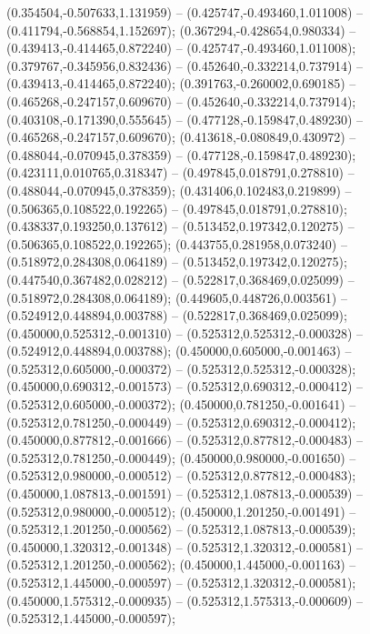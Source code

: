  (0.354504,-0.507633,1.131959) -- (0.425747,-0.493460,1.011008) -- (0.411794,-0.568854,1.152697);
 (0.367294,-0.428654,0.980334) -- (0.439413,-0.414465,0.872240) -- (0.425747,-0.493460,1.011008);
 (0.379767,-0.345956,0.832436) -- (0.452640,-0.332214,0.737914) -- (0.439413,-0.414465,0.872240);
 (0.391763,-0.260002,0.690185) -- (0.465268,-0.247157,0.609670) -- (0.452640,-0.332214,0.737914);
 (0.403108,-0.171390,0.555645) -- (0.477128,-0.159847,0.489230) -- (0.465268,-0.247157,0.609670);
 (0.413618,-0.080849,0.430972) -- (0.488044,-0.070945,0.378359) -- (0.477128,-0.159847,0.489230);
 (0.423111,0.010765,0.318347) -- (0.497845,0.018791,0.278810) -- (0.488044,-0.070945,0.378359);
 (0.431406,0.102483,0.219899) -- (0.506365,0.108522,0.192265) -- (0.497845,0.018791,0.278810);
 (0.438337,0.193250,0.137612) -- (0.513452,0.197342,0.120275) -- (0.506365,0.108522,0.192265);
 (0.443755,0.281958,0.073240) -- (0.518972,0.284308,0.064189) -- (0.513452,0.197342,0.120275);
 (0.447540,0.367482,0.028212) -- (0.522817,0.368469,0.025099) -- (0.518972,0.284308,0.064189);
 (0.449605,0.448726,0.003561) -- (0.524912,0.448894,0.003788) -- (0.522817,0.368469,0.025099);
 (0.450000,0.525312,-0.001310) -- (0.525312,0.525312,-0.000328) -- (0.524912,0.448894,0.003788);
 (0.450000,0.605000,-0.001463) -- (0.525312,0.605000,-0.000372) -- (0.525312,0.525312,-0.000328);
 (0.450000,0.690312,-0.001573) -- (0.525312,0.690312,-0.000412) -- (0.525312,0.605000,-0.000372);
 (0.450000,0.781250,-0.001641) -- (0.525312,0.781250,-0.000449) -- (0.525312,0.690312,-0.000412);
 (0.450000,0.877812,-0.001666) -- (0.525312,0.877812,-0.000483) -- (0.525312,0.781250,-0.000449);
 (0.450000,0.980000,-0.001650) -- (0.525312,0.980000,-0.000512) -- (0.525312,0.877812,-0.000483);
 (0.450000,1.087813,-0.001591) -- (0.525312,1.087813,-0.000539) -- (0.525312,0.980000,-0.000512);
 (0.450000,1.201250,-0.001491) -- (0.525312,1.201250,-0.000562) -- (0.525312,1.087813,-0.000539);
 (0.450000,1.320312,-0.001348) -- (0.525312,1.320312,-0.000581) -- (0.525312,1.201250,-0.000562);
 (0.450000,1.445000,-0.001163) -- (0.525312,1.445000,-0.000597) -- (0.525312,1.320312,-0.000581);
 (0.450000,1.575312,-0.000935) -- (0.525312,1.575313,-0.000609) -- (0.525312,1.445000,-0.000597);
